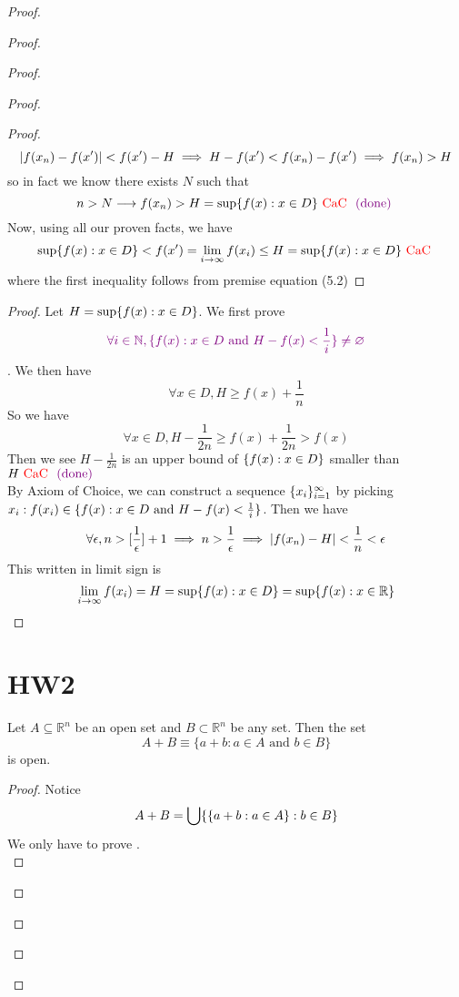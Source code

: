 \documentclass{report}
\begin{document}
\begin{proof}
\begin{proof}
\begin{proof}
\begin{proof}
\begin{proof}
\begin{equation}
|f(x_n)-f(x')|<f(x')-H\implies H-f(x')< f(x_n)-f(x')\implies f(x_n)>H
\end{equation}
so in fact we know there exists $N$ such that 
\begin{equation}
n>N \longrightarrow f(x_n)>H= \sup \{ f(x): x \in D \}\text{ \textcolor{red}{CaC} }\textcolor{violet}{\text{ (done) }}
\end{equation}
Now, using all our proven facts, we have
\begin{equation}
\sup \{ f(x): x\in D \}<f(x')=\lim_{i\to \infty }f(x_i)\leq H=\sup \{ f(x): x \in D \}\text{ \textcolor{red}{CaC} }
\end{equation}
where the first inequality follows from premise equation (5.2) 
\end{proof}
\begin{proof}
Let $H=\sup \{ f(x): x \in D \}$. We first prove
\begin{equation}
\textcolor{violet}{\forall i \in \mathbb{N}, \{ f(x): x \in D\text{ and }H-f(x)<\frac{1}{i} \}\neq \varnothing}
\end{equation}
. We then have
\begin{equation}
\forall x\in D, H\geq f(x)+\frac{1}{n}
\end{equation}
So we have
\begin{equation}
\forall x\in D, H-\frac{1}{2n}\geq f(x)+\frac{1}{2n}>f(x)
\end{equation}
Then we see $H-\frac{1}{2n}$ is an upper bound of $\{ f(x): x \in D \}$ smaller than $H\text{ \textcolor{red}{CaC} }\textcolor{violet}{\text{ (done) }}$\\

By Axiom of Choice, we can construct a sequence $\{ x_i \}_{i=1}^\infty$ by picking $x_i: f(x_i)\in \{ f(x):x \in D\text{ and }H-f(x)<\frac{1}{i} \}$. Then we have
\begin{equation}
\forall \epsilon, n> [\frac{1}{\epsilon }]+1\implies n>\frac{1}{\epsilon }\implies |f(x_n)-H|<\frac{1}{n}<\epsilon 
\end{equation}
This written in limit sign is 
\begin{equation}
\lim_{i\to \infty}f(x_i)=H=\sup \{ f(x): x\in D \}=\sup \{ f(x):x \in\mathbb{R} \}
\end{equation}
\end{proof}
\section{HW2}
\begin{question}{}{}

Let \(A \subseteq \mathbb{R}^n\) be an open set and \(B \subset \mathbb{R}^n\) be any set. Then the set 
\[ A + B \equiv \{a + b : a \in A \text{ and } b \in B\} \]
is open.
\end{question}
\begin{proof}
Notice 
\begin{equation}
A+B= \bigcup \{ \{ a+b:a\in A \}:b\in B \}
\end{equation}
We only have to prove  .\\


\end{proof}
\end{proof}
\end{proof}
\end{proof}
\end{proof}
\end{document}
